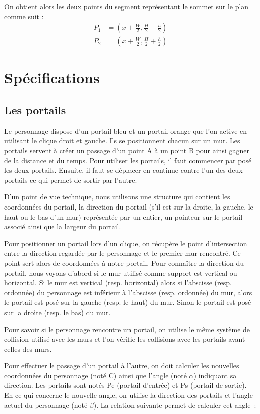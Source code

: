 \documentclass[11pt]{article}
\begin{document}
On obtient alors les deux points du segment représentant le sommet sur le plan comme suit :
\begin{align*}
    P_1 &= (x + \frac{W}{2}, \frac{H}{2} - \frac{h}{2}) \\
	P_2 &= (x + \frac{W}{2}, \frac{H}{2} + \frac{h}{2})
\end{align*}

\section{Spécifications}
\subsection{Les portails}

Le personnage dispose d’un portail bleu et un portail orange que l’on active en utilisant le clique droit et gauche. Ils se positionnent chacun sur un mur. Les portails servent à créer un passage d’un point A à un point B pour ainsi gagner de la distance et du temps.
Pour utiliser les portails, il faut commencer par posé les deux portails. Ensuite, il faut se déplacer en continue contre l’un des deux portails ce qui permet de sortir par l’autre.

D’un point de vue technique, nous utilisons une structure qui contient les coordonnées du portail, la direction du portail (s’il est sur la droite, la gauche, le haut ou le bas d’un mur) représentée par un entier, un pointeur sur le portail associé ainsi que la largeur du portail.

Pour positionner un portail lors d’un clique, on récupère le point d’intersection entre la direction regardée par le personnage et le premier mur rencontré. Ce point sert alors de coordonnées à notre portail. Pour connaître la direction du portail, nous voyons d’abord si le mur utilisé comme support est vertical ou horizontal. 
Si le mur est vertical (resp. horizontal) alors si l’abscisse (resp. ordonnée) du personnage est inférieur à l’abscisse (resp. ordonnée) du mur, alors le portail est posé sur la gauche (resp. le haut) du mur. Sinon  le portail est posé sur la droite (resp. le bas) du mur.

Pour savoir si le personnage rencontre un portail, on utilise le même système de collision utilisé avec les murs et l’on vérifie les collisions avec les portails avant celles des murs.

Pour effectuer le passage d’un portail à l’autre, on doit calculer les nouvelles coordonnées du personnage (noté C) ainsi que l’angle (noté $\alpha$) indiquant sa direction. Les portails sont notés Pe (portail d’entrée) et Ps (portail de sortie).
En ce qui concerne le nouvelle angle, on utilise la direction des portails et l’angle actuel du personnage (noté $\beta$). La relation suivante permet de calculer cet angle :
\end{document}
